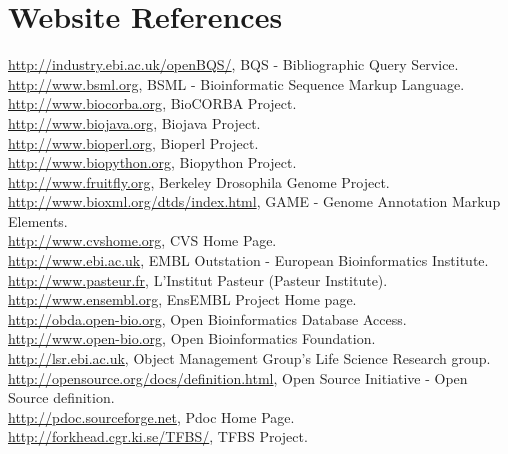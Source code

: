\documentclass[12pt]{article}
\begin{document}
\section{Website References}
\url{http://industry.ebi.ac.uk/openBQS/}, BQS - Bibliographic Query Service.\\
\url{http://www.bsml.org}, BSML - Bioinformatic Sequence Markup Language. \\
\url{http://www.biocorba.org}, BioCORBA Project. \\
\url{http://www.biojava.org}, Biojava Project. \\
\url{http://www.bioperl.org}, Bioperl Project. \\
\url{http://www.biopython.org}, Biopython Project. \\
\url{http://www.fruitfly.org}, Berkeley Drosophila Genome Project.\\
\url{http://www.bioxml.org/dtds/index.html},  GAME - Genome
Annotation Markup Elements. \\ 
\url{http://www.cvshome.org}, CVS Home Page. \\
\url{http://www.ebi.ac.uk}, EMBL Outstation - European Bioinformatics
Institute. \\ 
\url{http://www.pasteur.fr}, L'Institut Pasteur (Pasteur Institute). \\
\url{http://www.ensembl.org}, EnsEMBL Project Home page. \\
\url{http://obda.open-bio.org}, Open Bioinformatics Database Access. \\
\url{http://www.open-bio.org}, Open Bioinformatics Foundation. \\
\url{http://lsr.ebi.ac.uk}, Object Management Group's Life Science Research group. \\
\url{http://opensource.org/docs/definition.html}, Open Source
Initiative - Open Source definition. \\
\url{http://pdoc.sourceforge.net}, Pdoc Home Page. \\
\url{http://forkhead.cgr.ki.se/TFBS/}, TFBS Project. \\

\newpage 


\pagestyle{fancy}
\fancyhf{}
\renewcommand{\headrulewidth}{0pt}

\end{document}
